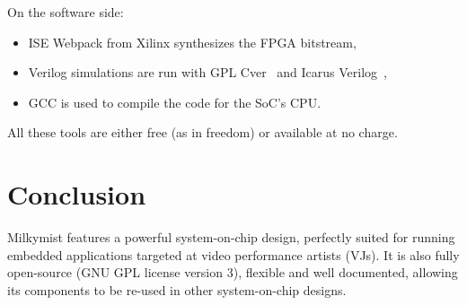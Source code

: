 \documentclass[a4paper,11pt,twocolumn]{paper}
\begin{document}
On the software side:
\begin{itemize}
\item ISE Webpack from Xilinx synthesizes the FPGA bitstream,
\item Verilog simulations are run with GPL Cver~\cite{gplcver} and Icarus Verilog~\cite{icarus},
\item GCC is used to compile the code for the SoC's CPU.
\end{itemize}

All these tools are either free (as in freedom) or available at no charge.

\section{Conclusion}
Milkymist features a powerful system-on-chip design, perfectly suited for running embedded applications targeted at video performance artists (VJs). It is also fully open-source (GNU GPL license version 3), flexible and well documented, allowing its components to be re-used in other system-on-chip designs.

{}

\end{document}
